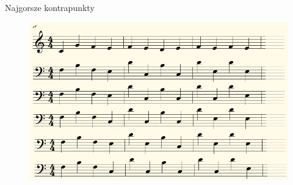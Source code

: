 \documentclass{beamer}
\begin{document}
\begin{frame}{Najgorsze kontrapunkty}
	\begin{figure}
	   \includegraphics[scale=0.4]{images/najgorsze_kontrapunkty.png}
	\end{figure}
\end{frame}
\end{document}
